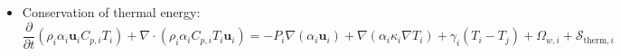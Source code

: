 \documentclass[calculator,datasheet]{exam}
\newcommand{\frc}{\displaystyle\frac}
\begin{document}
\begin{question}
\begin{enumerate}[(a)]
\begin{itemize}
\item Conservation of thermal energy:
\begin{displaymath}
\frc{\partial}{\partial t}\left(\rho_{i}\alpha_{i}\mathbf{u}_{i}C_{p,i}T_{i}\right) + \nabla\cdot\left(\rho_{i}\alpha_{i}C_{p,i}T_{i}\mathbf{u}_{i}\right) = -P_{i}\nabla\left(\alpha_{i}\mathbf{u}_{i}\right) + \nabla\left(\alpha_{i}\kappa_{i}\nabla T_{i}\right) + \gamma_{i}\left(T_{i}-T_{j}\right) + \Omega_{w,i} + \mathcal{S}_{\text{therm},i}
\end{displaymath}

\end{itemize}

\end{enumerate}

\end{question}


\vfill


\paperend
\end{document}

